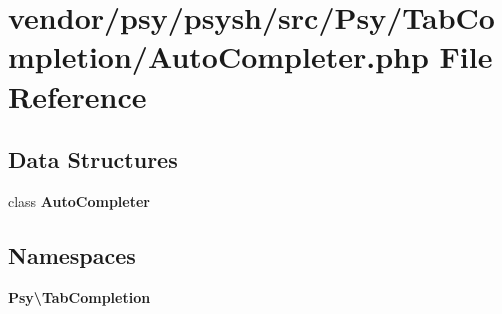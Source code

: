 \section{vendor/psy/psysh/src/\+Psy/\+Tab\+Completion/\+Auto\+Completer.php File Reference}
\label{_auto_completer_8php}
\subsection*{Data Structures}
\begin{DoxyCompactItemize}
\item 
class {\bf Auto\+Completer}
\end{DoxyCompactItemize}
\subsection*{Namespaces}
\begin{DoxyCompactItemize}
\item 
 {\bf Psy\textbackslash{}\+Tab\+Completion}
\end{DoxyCompactItemize}
